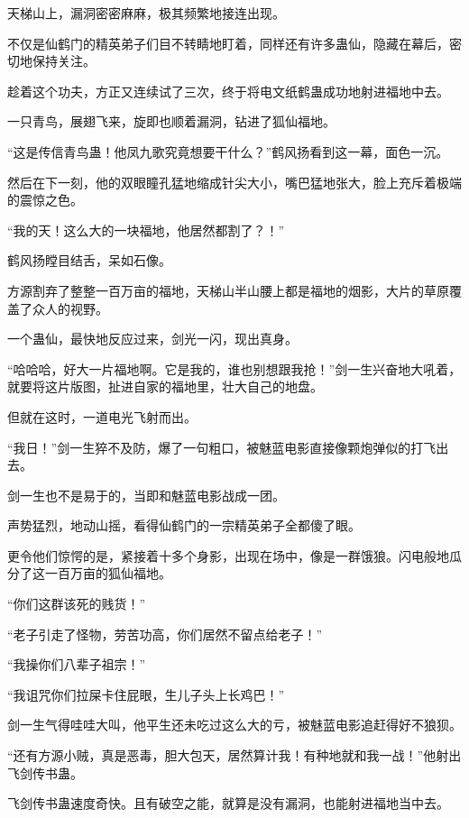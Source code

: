 
\begin{this_body}



天梯山上，漏洞密密麻麻，极其频繁地接连出现。

不仅是仙鹤门的精英弟子们目不转睛地盯着，同样还有许多蛊仙，隐藏在幕后，密切地保持关注。

趁着这个功夫，方正又连续试了三次，终于将电文纸鹤蛊成功地射进福地中去。

一只青鸟，展翅飞来，旋即也顺着漏洞，钻进了狐仙福地。

“这是传信青鸟蛊！他凤九歌究竟想要干什么？”鹤风扬看到这一幕，面色一沉。

然后在下一刻，他的双眼瞳孔猛地缩成针尖大小，嘴巴猛地张大，脸上充斥着极端的震惊之色。

“我的天！这么大的一块福地，他居然都割了？！”

鹤风扬瞠目结舌，呆如石像。

方源割弃了整整一百万亩的福地，天梯山半山腰上都是福地的烟影，大片的草原覆盖了众人的视野。

一个蛊仙，最快地反应过来，剑光一闪，现出真身。

“哈哈哈，好大一片福地啊。它是我的，谁也别想跟我抢！”剑一生兴奋地大吼着，就要将这片版图，扯进自家的福地里，壮大自己的地盘。

但就在这时，一道电光飞射而出。

“我日！”剑一生猝不及防，爆了一句粗口，被魅蓝电影直接像颗炮弹似的打飞出去。

剑一生也不是易于的，当即和魅蓝电影战成一团。

声势猛烈，地动山摇，看得仙鹤门的一宗精英弟子全都傻了眼。

更令他们惊愕的是，紧接着十多个身影，出现在场中，像是一群饿狼。闪电般地瓜分了这一百万亩的狐仙福地。

“你们这群该死的贱货！”

“老子引走了怪物，劳苦功高，你们居然不留点给老子！”

“我操你们八辈子祖宗！”

“我诅咒你们拉屎卡住屁眼，生儿子头上长鸡巴！”

剑一生气得哇哇大叫，他平生还未吃过这么大的亏，被魅蓝电影追赶得好不狼狈。

“还有方源小贼，真是恶毒，胆大包天，居然算计我！有种地就和我一战！”他射出飞剑传书蛊。

飞剑传书蛊速度奇快。且有破空之能，就算是没有漏洞，也能射进福地当中去。


\end{this_body}
